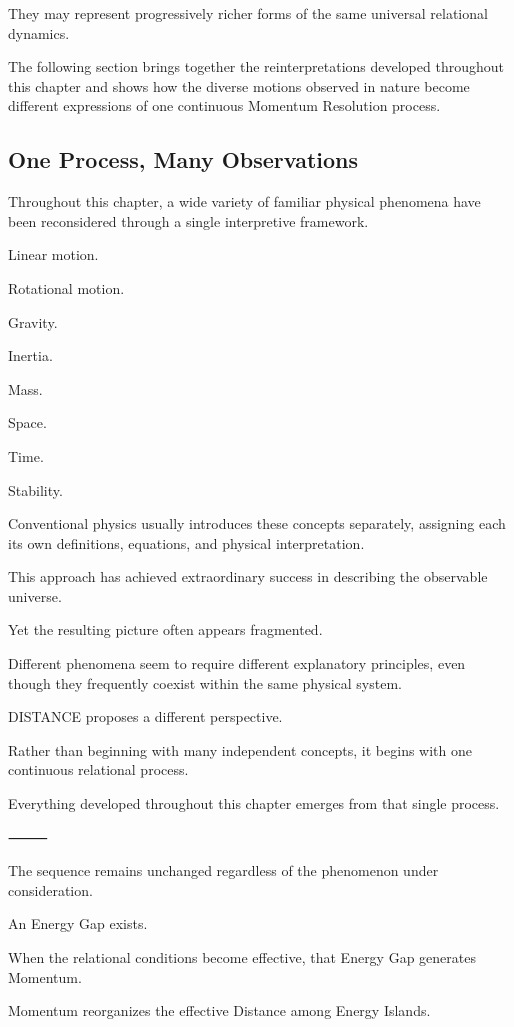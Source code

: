 They may represent progressively richer forms of the same universal relational dynamics.

The following section brings together the reinterpretations developed throughout this chapter and shows how the diverse motions observed in nature become different expressions of one continuous Momentum Resolution process.

\subsection*{\textbf{One Process, Many Observations}}

Throughout this chapter, a wide variety of familiar physical phenomena have been reconsidered through a single interpretive framework.

Linear motion.

Rotational motion.

Gravity.

Inertia.

Mass.

Space.

Time.

Stability.

Conventional physics usually introduces these concepts separately, assigning each its own definitions, equations, and physical interpretation.

This approach has achieved extraordinary success in describing the observable universe.

Yet the resulting picture often appears fragmented.

Different phenomena seem to require different explanatory principles, even though they frequently coexist within the same physical system.

DISTANCE proposes a different perspective.

Rather than beginning with many independent concepts, it begins with one continuous relational process.

Everything developed throughout this chapter emerges from that single process.

⸻

The sequence remains unchanged regardless of the phenomenon under consideration.

An Energy Gap exists.

When the relational conditions become effective, that Energy Gap generates Momentum.

Momentum reorganizes the effective Distance among Energy Islands.

